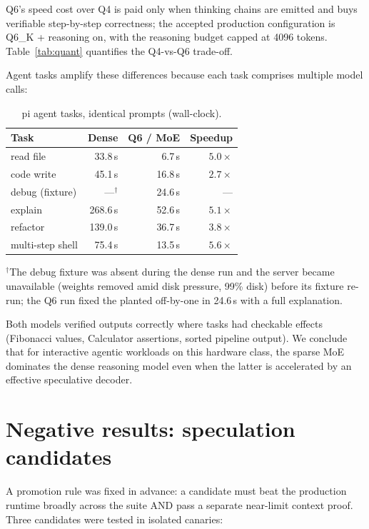 \documentclass[11pt]{article}
\begin{document}
Q6's speed cost over Q4 is paid only when thinking chains are emitted and buys
verifiable step-by-step correctness; the accepted production configuration is
Q6\_K + reasoning on, with the reasoning budget capped at 4096 tokens.
Table~\ref{tab:quant} quantifies the Q4-vs-Q6 trade-off.

Agent tasks amplify these differences because each task comprises multiple
model calls:

\begin{table}[h]
\centering
\caption{pi agent tasks, identical prompts (wall-clock).}
\label{tab:agent}
\begin{tabular}{lrrr}
\toprule
Task & Dense & Q6 / MoE & Speedup \\
\midrule
read file        & 33.8\,s & 6.7\,s & $5.0\times$ \\
code write       & 45.1\,s & 16.8\,s & $2.7\times$  \\
debug (fixture)  & ---$^{\dagger}$ & 24.6\,s & --- \\
explain          & 268.6\,s & 52.6\,s & $5.1\times$ \\
refactor         & 139.0\,s & 36.7\,s & $3.8\times$ \\
multi-step shell & 75.4\,s & 13.5\,s & $5.6\times$ \\
\bottomrule
\end{tabular}

\smallskip
{\footnotesize $^{\dagger}$The debug fixture was absent during the dense run and the server
became unavailable (weights removed amid disk pressure, 99\% disk) before its
fixture re-run; the Q6 run fixed the planted off-by-one in 24.6\,s with a full
explanation.}
\end{table}

Both models verified outputs correctly where tasks had checkable effects
(Fibonacci values, Calculator assertions, sorted pipeline output). We conclude
that for interactive agentic workloads on this hardware class, the sparse MoE
dominates the dense reasoning model even when the latter is accelerated by an
effective speculative decoder.

\section{Negative results: speculation candidates}
\label{sec:negative}

A promotion rule was fixed in advance: a candidate must beat the production
runtime broadly across the suite AND pass a separate near-limit context proof.
Three candidates were tested in isolated canaries:
\end{document}
